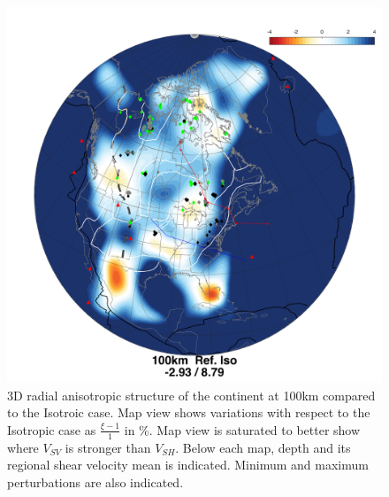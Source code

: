 \documentclass[12pt]{article}
\begin{document}
	\begin{figure}
		\centerline{\includegraphics[width=\linewidth]{figures/Xi_NASEM-iter3-Xi-iso_100km.png}}

		\caption{3D radial anisotropic structure of the continent at 100km compared to the Isotroic case. 
		Map view shows variations with respect to the Isotropic case as $\frac{\xi - 1}{1}$ in \%. 
		Map view is saturated to better show where $V_{SV}$ is stronger than $V_{SH}$.
		Below each map, depth and its regional shear velocity mean is indicated. Minimum and maximum perturbations are also indicated.}
		\label{3d-xi-iso-100km}

	\end{figure}


%
\end{document}
